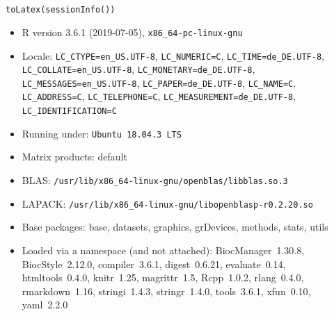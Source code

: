 \documentclass{article}\usepackage[]{graphicx}\usepackage[usenames,dvipsnames]{color}
\newcommand{\hlstd}[1]{\textcolor[rgb]{0.251,0.251,0.251}{#1}}%
\newcommand{\hlkwd}[1]{\textcolor[rgb]{0.878,0.439,0.125}{#1}}%
\begin{document}
\section{}

\begin{kframe}
\begin{alltt}
\hlkwd{toLatex}\hlstd{(}\hlkwd{sessionInfo}\hlstd{())}
\end{alltt}
\end{kframe}\begin{itemize}\raggedright
  \item R version 3.6.1 (2019-07-05), \verb|x86_64-pc-linux-gnu|
  \item Locale: \verb|LC_CTYPE=en_US.UTF-8|, \verb|LC_NUMERIC=C|, \verb|LC_TIME=de_DE.UTF-8|, \verb|LC_COLLATE=en_US.UTF-8|, \verb|LC_MONETARY=de_DE.UTF-8|, \verb|LC_MESSAGES=en_US.UTF-8|, \verb|LC_PAPER=de_DE.UTF-8|, \verb|LC_NAME=C|, \verb|LC_ADDRESS=C|, \verb|LC_TELEPHONE=C|, \verb|LC_MEASUREMENT=de_DE.UTF-8|, \verb|LC_IDENTIFICATION=C|
  \item Running under: \verb|Ubuntu 18.04.3 LTS|
  \item Matrix products: default
  \item BLAS:   \verb|/usr/lib/x86_64-linux-gnu/openblas/libblas.so.3|
  \item LAPACK: \verb|/usr/lib/x86_64-linux-gnu/libopenblasp-r0.2.20.so|
  \item Base packages: base, datasets, graphics, grDevices, methods,
    stats, utils
  \item Loaded via a namespace (and not attached):
    BiocManager~1.30.8, BiocStyle~2.12.0, compiler~3.6.1,
    digest~0.6.21, evaluate~0.14, htmltools~0.4.0, knitr~1.25,
    magrittr~1.5, Rcpp~1.0.2, rlang~0.4.0, rmarkdown~1.16,
    stringi~1.4.3, stringr~1.4.0, tools~3.6.1, xfun~0.10, yaml~2.2.0
\end{itemize}
\end{document}
